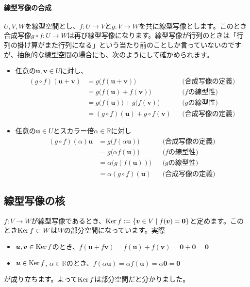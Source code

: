 \paragraph{線型写像の合成}
$U, V, W$を線型空間とし、$f\colon U\rightarrow V$と$g\colon V\rightarrow W$を共に線型写像とします。このとき合成写像$g\circ f\colon U\rightarrow W$は再び線型写像になります。線型写像が行列のときは「行列の掛け算がまた行列になる」という当たり前のことしか言っていないのですが、抽象的な線型空間の場合にも、次のようにして確かめられます。
\begin{itemize}
\item 任意の$\bm{u}, \bm{v}\in U$に対し、
\begin{align*}
(g\circ f)(\bm{u} + \bm{v}) &= g\bigl(f(\bm{u} + \bm{v})\bigr) & & \text{(合成写像の定義)} \\
&= g\bigl(f(\bm{u}) + f(\bm{v})\bigr) & & \text{($f$の線型性)} \\
&= g\bigl(f(\bm{u})\bigr) + g\bigl(f(\bm{v})\bigr) & & \text{($g$の線型性)} \\
&= (g\circ f)(\bm{u}) + g\circ f(\bm{v}) & & \text{(合成写像の定義)}
\end{align*}
\item 任意の$\bm{u}\in U$とスカラー倍$\alpha \in\mathbb{R}$に対し
\begin{align*}
(g\circ f)(\alpha) \bm{u} &= g\bigl(f(\alpha\bm{u})\bigr) & & \text{(合成写像の定義)} \\
&= g\bigl(\alpha f(\bm{u})\bigr) & & \text{($f$の線型性)} \\
&= \alpha \bigl(g(f(\bm{u}))\bigr) & & \text{($g$の線型性)} \\
&= \alpha (g\circ f)(\bm{u}) & & \text{(合成写像の定義)}
\end{align*}
\end{itemize}

\subsection{線型写像の核}

$f\colon V\rightarrow W$が線型写像であるとき、$\operatorname{Ker} f:=\{\boldsymbol{v} \in V \mid f(\boldsymbol{v}) = \boldsymbol{0}\}$と定めます。このとき$\operatorname{Ker} f\subset W$は$W$の部分空間になっています。実際
\begin{itemize}
\item $\boldsymbol{u}, \boldsymbol{v}\in \operatorname{Ker} f$のとき、$f(\bm{u} + f\bm{v}) = f(\bm{u}) + f(\bm{v}) = \bm{0} + \bm{0} = \bm{0}$
\item $\boldsymbol{u} \in \operatorname{Ker} f$, $\alpha\in\mathbb{R}$のとき、$f(\alpha\bm{u}) = \alpha f(\bm{u}) = \alpha \bm{0} = \bm{0}$
\end{itemize}
が成り立ちます。よって$\operatorname{Ker} f$は部分空間だと分かりました。

